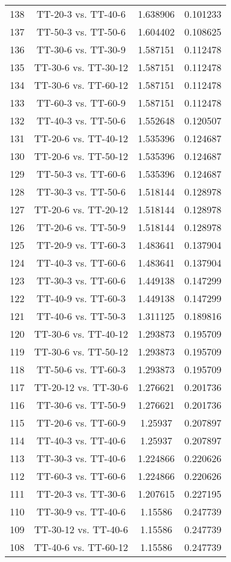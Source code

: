 \documentclass[a4paper,10pt]{article}
\begin{document}
\begin{landscape}
\begin{table}[!htp]
\begin{tabular}{cccc}
138&TT-20-3 vs. TT-40-6&1.638906&0.101233\\
137&TT-50-3 vs. TT-50-6&1.604402&0.108625\\
136&TT-30-6 vs. TT-30-9&1.587151&0.112478\\
135&TT-30-6 vs. TT-30-12&1.587151&0.112478\\
134&TT-30-6 vs. TT-60-12&1.587151&0.112478\\
133&TT-60-3 vs. TT-60-9&1.587151&0.112478\\
132&TT-40-3 vs. TT-50-6&1.552648&0.120507\\
131&TT-20-6 vs. TT-40-12&1.535396&0.124687\\
130&TT-20-6 vs. TT-50-12&1.535396&0.124687\\
129&TT-50-3 vs. TT-60-6&1.535396&0.124687\\
128&TT-30-3 vs. TT-50-6&1.518144&0.128978\\
127&TT-20-6 vs. TT-20-12&1.518144&0.128978\\
126&TT-20-6 vs. TT-50-9&1.518144&0.128978\\
125&TT-20-9 vs. TT-60-3&1.483641&0.137904\\
124&TT-40-3 vs. TT-60-6&1.483641&0.137904\\
123&TT-30-3 vs. TT-60-6&1.449138&0.147299\\
122&TT-40-9 vs. TT-60-3&1.449138&0.147299\\
121&TT-40-6 vs. TT-50-3&1.311125&0.189816\\
120&TT-30-6 vs. TT-40-12&1.293873&0.195709\\
119&TT-30-6 vs. TT-50-12&1.293873&0.195709\\
118&TT-50-6 vs. TT-60-3&1.293873&0.195709\\
117&TT-20-12 vs. TT-30-6&1.276621&0.201736\\
116&TT-30-6 vs. TT-50-9&1.276621&0.201736\\
115&TT-20-6 vs. TT-60-9&1.25937&0.207897\\
114&TT-40-3 vs. TT-40-6&1.25937&0.207897\\
113&TT-30-3 vs. TT-40-6&1.224866&0.220626\\
112&TT-60-3 vs. TT-60-6&1.224866&0.220626\\
111&TT-20-3 vs. TT-30-6&1.207615&0.227195\\
110&TT-30-9 vs. TT-40-6&1.15586&0.247739\\
109&TT-30-12 vs. TT-40-6&1.15586&0.247739\\
108&TT-40-6 vs. TT-60-12&1.15586&0.247739\\

\end{tabular}
\end{table}
\end{landscape}
\end{document}
